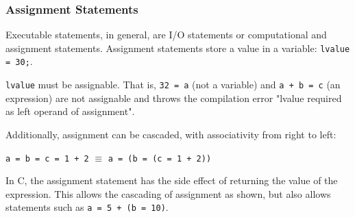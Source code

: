 \subsubsection{Assignment Statements}
Executable statements, in general, are I/O statements or computational and
assignment statements. Assignment statements store a value in a variable:
\verb|lvalue = 30;|.
\begin{remark}
  \verb|lvalue| must be assignable. That is, \verb|32 = a| (not a variable)
  and \verb|a + b = c| (an expression) are not assignable and throws the
  compilation error "lvalue required as left operand of assignment".
\end{remark}
Additionally, assignment can be cascaded, with associativity from right to left:

\centering
\verb|a = b = c = 1 + 2| $\equiv$ \verb|a = (b = (c = 1 + 2))|

\raggedright
In C, the assignment statement has the side effect of returning the value of
the expression. This allows the cascading of assignment as shown, but also
allows statements such as \verb|a = 5 + (b = 10)|.

